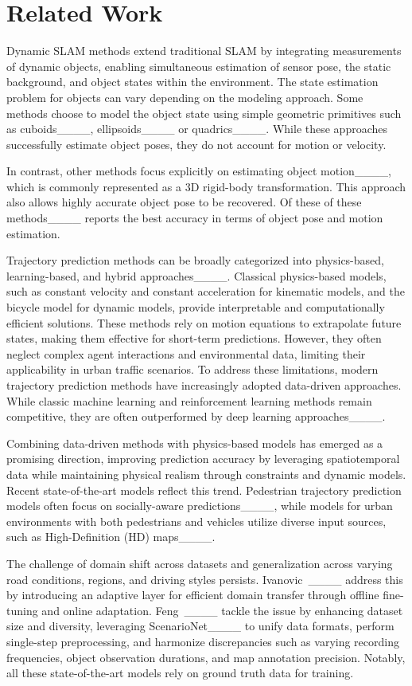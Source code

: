 \section{Related Work}
Dynamic SLAM methods extend traditional SLAM by integrating measurements of dynamic objects, enabling simultaneous estimation of sensor pose, the static background, and object states within the environment.
The state estimation problem for objects can vary depending on the modeling approach.
Some methods choose to model the object state using simple geometric primitives such as cuboids____, ellipsoids____ or quadrics____. 
While these approaches successfully estimate object poses, they do not account for motion or velocity.

In contrast, other methods focus explicitly on estimating object motion____, which is commonly represented as a 3D rigid-body transformation. This approach also allows highly accurate object pose to be recovered. 
Of these of these methods____ reports the best accuracy in terms of object pose and motion estimation. 

Trajectory prediction methods can be broadly categorized into physics-based, learning-based, and hybrid approaches____. Classical physics-based models, such as constant velocity and constant acceleration for kinematic models, and the bicycle model for dynamic models, provide interpretable and computationally efficient solutions. These methods rely on motion equations to extrapolate future states, making them effective for short-term predictions. However, they often neglect complex agent interactions and environmental data, limiting their applicability in urban traffic scenarios. To address these limitations, modern trajectory prediction methods have increasingly adopted data-driven approaches.
While classic machine learning and reinforcement learning methods remain competitive, they are often outperformed by deep learning approaches____.

Combining data-driven methods with physics-based models has emerged as a promising direction, improving prediction accuracy by leveraging spatiotemporal data while maintaining physical realism through constraints and dynamic models. Recent state-of-the-art models reflect this trend. Pedestrian trajectory prediction models often focus on socially-aware predictions____, while models for urban environments with both pedestrians and vehicles utilize diverse input sources, such as High-Definition (HD) maps____.

The challenge of domain shift across datasets and generalization across varying road conditions, regions, and driving styles persists. Ivanovic~\etal____ address this by introducing an adaptive layer for efficient domain transfer through offline fine-tuning and online adaptation. Feng~\etal____ tackle the issue by enhancing dataset size and diversity, leveraging ScenarioNet____ to unify data formats, perform single-step preprocessing, and harmonize discrepancies such as varying recording frequencies, object observation durations, and map annotation precision. Notably, all these state-of-the-art models rely on ground truth data for training.

